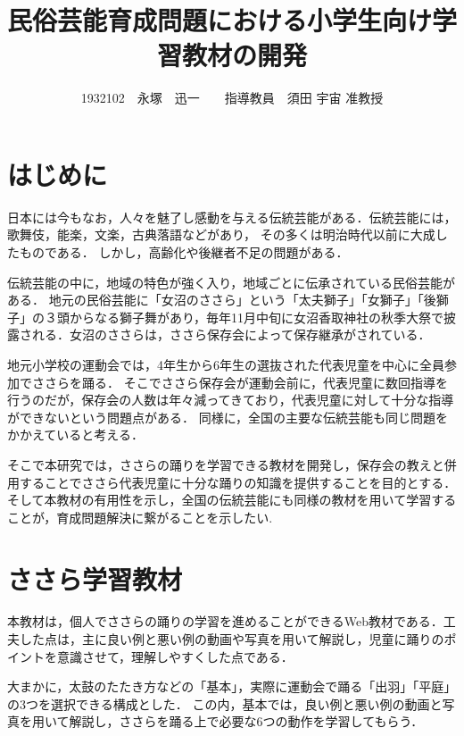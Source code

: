 \documentclass[twocolumn,10pt,a4j]{ltjsarticle}
\title{民俗芸能育成問題における小学生向け学習教材の開発}
\author{1932102　永塚　迅一　　指導教員　須田 宇宙 准教授}
\date{}
\begin{document}
\maketitle
\section{はじめに}

日本には今もなお，人々を魅了し感動を与える伝統芸能がある．伝統芸能には，歌舞伎，能楽，文楽，古典落語などがあり，
その多くは明治時代以前に大成したものである．
しかし，高齢化や後継者不足の問題がある．

伝統芸能の中に，地域の特色が強く入り，地域ごとに伝承されている民俗芸能がある．
地元の民俗芸能に「女沼のささら」という「太夫獅子」「女獅子」「後獅子」の３頭からなる獅子舞があり，毎年11月中旬に女沼香取神社の秋季大祭で披露される\cite{suda2018}．女沼のささらは，ささら保存会によって保存継承がされている．


地元小学校の運動会では，4年生から6年生の選抜された代表児童を中心に全員参加でささらを踊る．
そこでささら保存会が運動会前に，代表児童に数回指導を行うのだが，保存会の人数は年々減ってきており，代表児童に対して十分な指導ができないという問題点がある．
同様に，全国の主要な伝統芸能も同じ問題をかかえていると考える．

そこで本研究では，ささらの踊りを学習できる教材を開発し，保存会の教えと併用することでささら代表児童に十分な踊りの知識を提供することを目的とする．
そして本教材の有用性を示し，全国の伝統芸能にも同様の教材を用いて学習することが，育成問題解決に繋がることを示したい.

\section{ささら学習教材}
本教材は，個人でささらの踊りの学習を進めることができるWeb教材である．工夫した点は，主に良い例と悪い例の動画や写真を用いて解説し，児童に踊りのポイントを意識させて，理解しやすくした点である．

大まかに，太鼓のたたき方などの「基本」，実際に運動会で踊る「出羽」「平庭」の3つを選択できる構成とした．
この内，基本では，良い例と悪い例の動画と写真を用いて解説し，ささらを踊る上で必要な6つの動作を学習してもらう．
\end{document}

